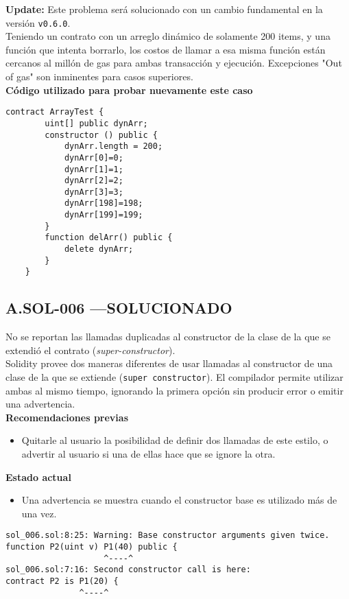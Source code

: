 \textbf{Update:} Este problema será solucionado con un cambio fundamental en la versión \texttt{v0.6.0}.\\

Teniendo un contrato con un arreglo dinámico de solamente 200 items, y una función que intenta borrarlo, los costos de llamar a esa misma función están cercanos al millón de gas para ambas transacción y ejecución. Excepciones "Out of gas" son inminentes para casos superiores.\\

\textbf{Código utilizado para probar nuevamente este caso}
\begin{lstlisting}[language=Solidity]
    contract ArrayTest {
        uint[] public dynArr;
        constructor () public {
            dynArr.length = 200;
            dynArr[0]=0;
            dynArr[1]=1;
            dynArr[2]=2;
            dynArr[3]=3;
            dynArr[198]=198;
            dynArr[199]=199;
        }
        function delArr() public {
            delete dynArr;
        }
    }    
\end{lstlisting}
\bigskip

\subsection*{A.SOL-006  \color{ForestGreen}—SOLUCIONADO}
No se reportan las llamadas duplicadas al constructor de la clase de la que se extendió el contrato (\textit{super-constructor}).\\

Solidity provee dos maneras diferentes de usar llamadas al constructor de una clase de la que se extiende (\texttt{super constructor}). El compilador permite utilizar ambas al mismo tiempo, ignorando la primera opción sin producir error o emitir una advertencia.\\

\textbf{Recomendaciones previas}
\begin{itemize}
    \item Quitarle al usuario la posibilidad de definir dos llamadas de este estilo, o advertir al usuario si una de ellas hace que se ignore la otra.
\end{itemize}
\bigskip

\textbf{Estado actual}
\begin{itemize}
    \item Una advertencia se muestra cuando el constructor base es utilizado más de una vez.
\end{itemize}
\begin{lstlisting}
sol_006.sol:8:25: Warning: Base constructor arguments given twice.
function P2(uint v) P1(40) public {
                    ^----^
sol_006.sol:7:16: Second constructor call is here:
contract P2 is P1(20) {
               ^----^
\end{lstlisting}
\bigskip

